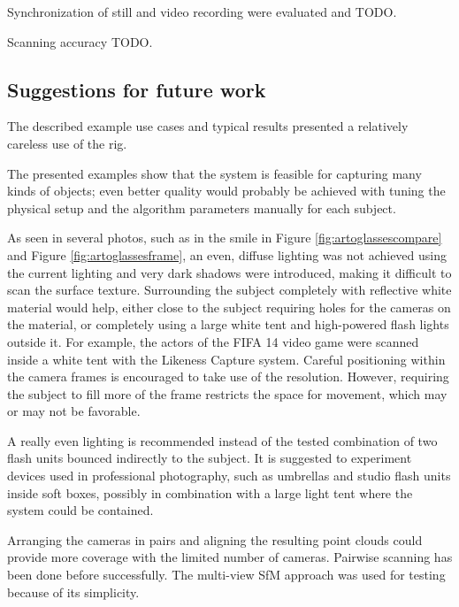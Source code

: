 Synchronization of still and video recording were evaluated and TODO.

Scanning accuracy TODO.

\subsection{Suggestions for future work}

The described example use cases and typical results presented a relatively careless use of the rig.

The presented examples show that the system is feasible for capturing many kinds of objects; even better quality would probably be achieved with tuning the physical setup and the algorithm parameters manually for each subject.

As seen in several photos, such as in the smile in Figure \ref{fig:artoglassescompare} and Figure \ref{fig:artoglassesframe}, an even, diffuse lighting was not achieved using the current lighting and very dark shadows were introduced, making it difficult to scan the surface texture.
Surrounding the subject completely with reflective white material would help, either close to the subject requiring holes for the cameras on the material, or completely using a large white tent and high-powered flash lights outside it.
For example, the actors of the FIFA 14 video game were scanned inside a white tent with the Likeness Capture system. \cite{eafifa14,capturelab}
Careful positioning within the camera frames is encouraged to take use of the resolution.
However, requiring the subject to fill more of the frame restricts the space for movement, which may or may not be favorable.

A really even lighting is recommended instead of the tested combination of two flash units bounced indirectly to the subject.
It is suggested to experiment devices used in professional photography, such as umbrellas and studio flash units inside soft boxes, possibly in combination with a large light tent where the system could be contained.


Arranging the cameras in pairs and aligning the resulting point clouds could provide more coverage with the limited number of cameras.
Pairwise scanning has been done before successfully. \cite{eafifa14,beeler2010high,bradley2010high}
The multi-view SfM approach was used for testing because of its simplicity.

